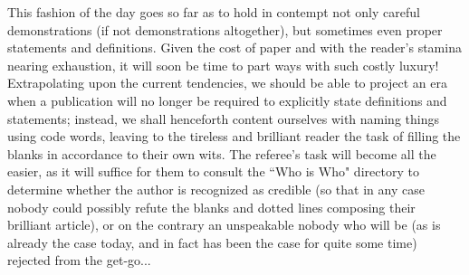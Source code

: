 This fashion of the day goes so far as to hold in contempt not only careful demonstrations (if not demonstrations altogether), but sometimes even proper statements and definitions. Given the cost of paper and with the reader's stamina nearing exhaustion, it will soon be time to part ways with such costly luxury! Extrapolating upon the current tendencies, we should be able to project an era when a publication will no longer be required to explicitly state definitions and statements; instead, we shall henceforth content ourselves with naming things using code words, leaving to the tireless and brilliant reader the task of filling the blanks in accordance to their own wits. The referee's task will become all the easier, as it will suffice for them to consult the ``Who is Who" directory to determine whether the author is recognized as credible (so that in any case nobody could possibly refute the blanks and dotted lines composing their brilliant article), or on the contrary an unspeakable nobody who will be (as is already the case today, and in fact has been the case for quite some time) rejected from the get-go...

%
